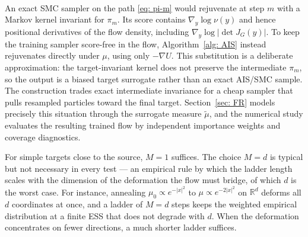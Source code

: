 \documentclass{article}
\begin{document}
\begin{algorithm}[htb]
\caption{Score-free annealing from $(G^{-1})_{\#}\mu_0$ toward $\mu$}
\label{alg: AIS}

\end{algorithm}
\mbox{} \\
An exact SMC sampler on the path \eqref{eq: pi-m} would rejuvenate at step $m$ with a Markov kernel invariant for $\pi_m$. Its score contains $\nabla_y\log\nu(y)$ and hence positional derivatives of the flow density, including $\nabla_y\log|\det J_G(y)|$. To keep the training sampler score-free in the flow, Algorithm~\ref{alg: AIS} instead rejuvenates directly under $\mu$, using only $-\nabla U$. This substitution is a deliberate approximation: the target-invariant kernel does not preserve the intermediate $\pi_m$, so the output is a biased target surrogate rather than an exact AIS/SMC sample. The construction trades exact intermediate invariance for a cheap sampler that pulls resampled particles toward the final target. Section~\ref{sec: FR} models precisely this situation through the surrogate measure $\tilde\mu$, and the numerical study evaluates the resulting trained flow by independent importance weights and coverage diagnostics.

\begin{remark}
\label{rem: ladder-length}
For simple targets close to the source, $M = 1$ suffices. The choice $M = d$ is typical but not necessary in every test --- an empirical rule by which the ladder length scales with the dimension of the deformation the flow must bridge, of which $d$ is the worst case. For instance, annealing $\mu_0 \propto e^{-|x|^2}$ to $\mu \propto e^{-2|x|^2}$ on $\mathbb R^d$ deforms all $d$ coordinates at once, and a ladder of $M = d$ steps keeps the weighted empirical distribution at a finite ESS that does not degrade with $d$. When the deformation concentrates on fewer directions, a much shorter ladder suffices.
\end{remark}
\end{document}
